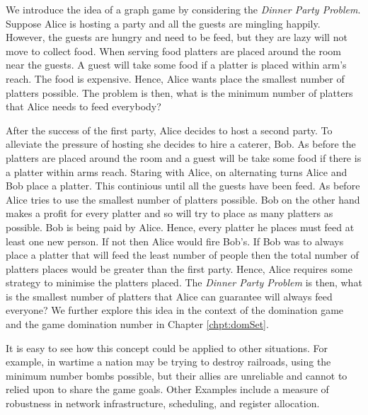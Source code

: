 We introduce the idea of a graph game by considering the \textit{Dinner Party Problem}.
Suppose Alice is hosting a party and all the guests are mingling happily. However, the guests are hungry and need to be feed, but they are lazy will not move to collect food. When serving food platters are placed around the room near the guests. A guest will take some food if a platter is placed within arm's reach. The food is expensive. Hence, Alice wants place the smallest number of platters possible. The problem is then, what is the minimum number of platters that Alice needs to feed everybody? 


After the success of the first party, Alice decides to host a second party. To alleviate the pressure of hosting she decides to hire a caterer, Bob. As before the platters are placed around the room and a guest will be take some food if there is a platter within arms reach. Staring with Alice, on alternating turns Alice and Bob place a platter. This continious until all the guests have been feed. As before Alice tries to use the smallest number of platters possible. Bob on the other hand makes a profit for every platter and so will try to place as many platters as possible. Bob is being paid by Alice. Hence, every platter he places must feed at least one new person. If not then Alice would fire Bob's.
If Bob was to always place a platter that will feed the least number of people then the total number of platters places would be greater than the first party. Hence, Alice requires some strategy to minimise the platters placed. The \textit{Dinner Party Problem} is then, what is the smallest number of platters that Alice can guarantee will always feed everyone? 
We further explore this idea in the context of the domination game and the game domination number in Chapter \ref{chpt:domSet}.

It is easy to see how this concept could be applied to other situations. For example, in wartime a nation may be trying to destroy railroads, using the minimum number bombs possible, but their allies are unreliable and cannot to relied upon to share the game goals. Other Examples include a measure of robustness in network infrastructure, scheduling, and register allocation.  

